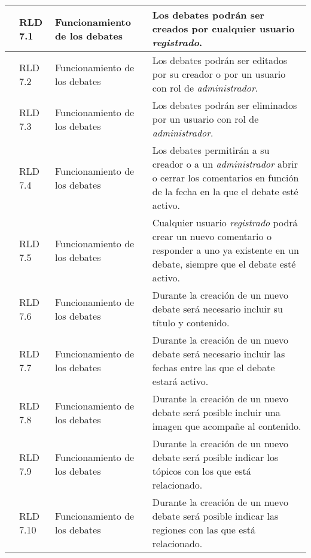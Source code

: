 \begin{longtable}[c]{|p{1mm}|p{14mm}|p{30mm}|p{90mm}|}
\hline
& RLD 7.1 & Funcionamiento de los debates & Los debates podrán ser creados por cualquier usuario \textit{registrado}. \\
\hline
& RLD 7.2 & Funcionamiento de los debates & Los debates podrán ser editados por su creador o por un usuario con rol de \textit{administrador}. \\
\hline
& RLD 7.3 & Funcionamiento de los debates & Los debates podrán ser eliminados por un usuario con rol de \textit{administrador}. \\
\hline
& RLD 7.4 & Funcionamiento de los debates & Los debates permitirán a su creador o a un \textit{administrador} abrir o cerrar los comentarios en función de la fecha en la que el debate esté activo. \\
\hline
& RLD 7.5 & Funcionamiento de los debates & Cualquier usuario \textit{registrado} podrá crear un nuevo comentario o responder a uno ya existente en un debate, siempre que el debate esté activo. \\
\hline
& RLD 7.6 & Funcionamiento de los debates & Durante la creación de un nuevo debate será necesario incluir su título y contenido. \\
\hline
& RLD 7.7 & Funcionamiento de los debates & Durante la creación de un nuevo debate será necesario incluir las fechas entre las que el debate estará activo. \\
\hline
& RLD 7.8 & Funcionamiento de los debates & Durante la creación de un nuevo debate será posible incluir una imagen que acompañe al contenido. \\
\hline
& RLD 7.9 & Funcionamiento de los debates & Durante la creación de un nuevo debate será posible indicar los tópicos con los que está relacionado. \\
\hline
& RLD 7.10 & Funcionamiento de los debates & Durante la creación de un nuevo debate será posible indicar las regiones con las que está relacionado. \\
\hline
\hline

 \end{longtable}
 
 
 
 
 
 
 
 
 
 
 
 
 
 
 
 
 
 
 
 
 